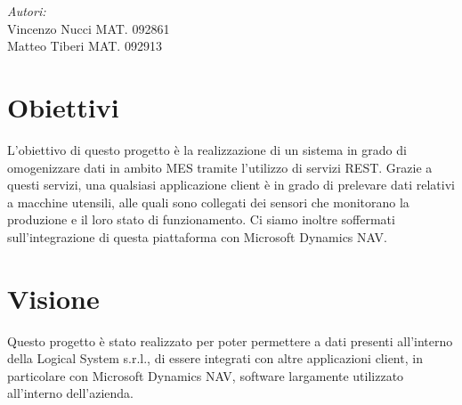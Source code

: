 \begin{titlepage}
\begin{minipage}{0.4\textwidth}
\begin{flushleft} \large
\emph{Autori:}\\
Vincenzo Nucci MAT. 092861 \\
Matteo Tiberi MAT. 092913
\end{flushleft}
\end{minipage}







 

\vfill %

\end{titlepage}
\section{Obiettivi}
L'obiettivo di questo progetto è la realizzazione di un sistema in grado di omogenizzare dati in ambito MES tramite l'utilizzo di servizi REST. Grazie a questi servizi, una qualsiasi applicazione client è in grado di prelevare dati relativi a macchine utensili, alle quali sono collegati dei sensori che monitorano la produzione e il loro stato di funzionamento. Ci siamo inoltre soffermati sull'integrazione di questa piattaforma con Microsoft Dynamics NAV.
\section{Visione}
Questo progetto è stato realizzato per poter permettere a dati presenti all'interno della Logical System s.r.l., di essere integrati con altre applicazioni client, in particolare con Microsoft Dynamics NAV, software largamente utilizzato all'interno dell'azienda.

